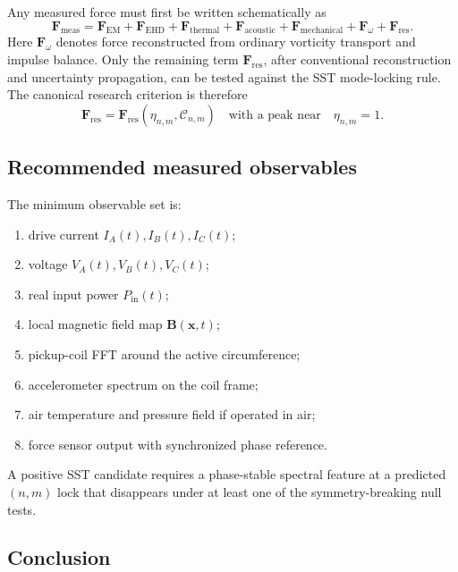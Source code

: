 Any measured force must first be written schematically as
\begin{equation}
\mathbf{F}_{\mathrm{meas}}
=
\mathbf{F}_{\mathrm{EM}}
+
\mathbf{F}_{\mathrm{EHD}}
+
\mathbf{F}_{\mathrm{thermal}}
+
\mathbf{F}_{\mathrm{acoustic}}
+
\mathbf{F}_{\mathrm{mechanical}}
+
\mathbf{F}_{\omega}
+
\mathbf{F}_{\mathrm{res}} .
\label{eq:appendix_force_budget}
\end{equation}
Here $\mathbf{F}_{\omega}$ denotes force reconstructed from ordinary vorticity transport and impulse balance. Only the remaining term $\mathbf{F}_{\mathrm{res}}$, after conventional reconstruction and uncertainty propagation, can be tested against the SST mode-locking rule. The canonical research criterion is therefore
\begin{equation}
\boxed{
\mathbf{F}_{\mathrm{res}}
=
\mathbf{F}_{\mathrm{res}}(\eta_{n,m},\mathcal{C}_{n,m})
\quad\text{with a peak near}\quad
\eta_{n,m}=1.
}
\end{equation}

\subsection{Recommended measured observables}

The minimum observable set is:
\begin{enumerate}
\item drive current $I_A(t),I_B(t),I_C(t)$;
\item voltage $V_A(t),V_B(t),V_C(t)$;
\item real input power $P_{\mathrm{in}}(t)$;
\item local magnetic field map $\mathbf{B}(\mathbf{x},t)$;
\item pickup-coil FFT around the active circumference;
\item accelerometer spectrum on the coil frame;
\item air temperature and pressure field if operated in air;
\item force sensor output with synchronized phase reference.
\end{enumerate}
A positive SST candidate requires a phase-stable spectral feature at a predicted $(n,m)$ lock that disappears under at least one of the symmetry-breaking null tests.

\subsection{Conclusion}

